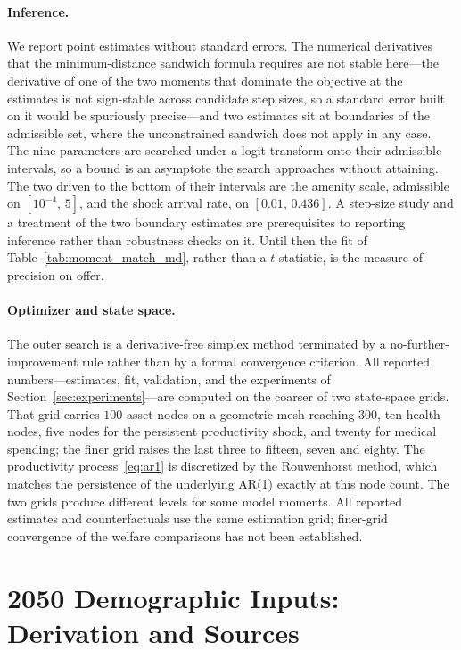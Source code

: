 \documentclass[12pt,a4paper]{article}
\begin{document}
\begin{appendices}
\paragraph{Inference.} We report point estimates without standard errors. The numerical derivatives that the minimum-distance sandwich formula requires are not stable here---the derivative of one of the two moments that dominate the objective at the estimates is not sign-stable across candidate step sizes, so a standard error built on it would be spuriously precise---and two estimates sit at boundaries of the admissible set, where the unconstrained sandwich does not apply in any case. The nine parameters are searched under a logit transform onto their admissible intervals, so a bound is an asymptote the search approaches without attaining. The two driven to the bottom of their intervals are the amenity scale, admissible on $[10^{-4},\,5]$, and the shock arrival rate, on $[0.01,\,0.436]$. A step-size study and a treatment of the two boundary estimates are prerequisites to reporting inference rather than robustness checks on it. Until then the fit of Table~\ref{tab:moment_match_md}, rather than a $t$-statistic, is the measure of precision on offer.

\paragraph{Optimizer and state space.} The outer search is a derivative-free simplex method terminated by a no-further-improvement rule rather than by a formal convergence criterion. All reported numbers---estimates, fit, validation, and the experiments of Section~\ref{sec:experiments}---are computed on the coarser of two state-space grids. That grid carries $100$ asset nodes on a geometric mesh reaching $300$, ten health nodes, five nodes for the persistent productivity shock, and twenty for medical spending; the finer grid raises the last three to fifteen, seven and eighty. The productivity process~\eqref{eq:ar1} is discretized by the Rouwenhorst method, which matches the persistence of the underlying AR(1) exactly at this node count. The two grids produce different levels for some model moments. All reported estimates and counterfactuals use the same estimation grid; finer-grid convergence of the welfare comparisons has not been established.

\section{2050 Demographic Inputs: Derivation and Sources}
\label{app:demog2050}


\end{appendices}
\end{document}
